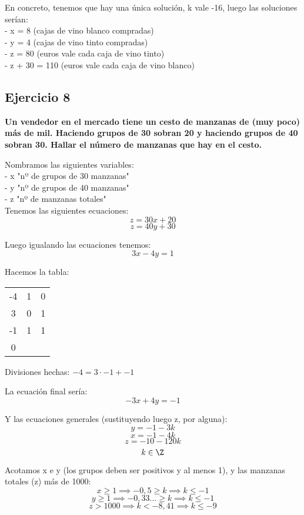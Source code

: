 \documentclass[11pt, a4paper, titlepage]{article}
\begin{document}
En concreto, tenemos que hay una única solución, k vale -16, luego las soluciones serían: \\
- x = 8 (cajas de vino blanco compradas) \\
- y = 4 (cajas de vino tinto compradas) \\
- z = 80 (euros vale cada caja de vino tinto) \\
- z + 30 = 110 (euros vale cada caja de vino blanco) \\

\subsection{\LARGE{Ejercicio 8}}

\textbf{Un vendedor en el mercado tiene un cesto de manzanas de (muy poco)
más de mil. Haciendo grupos de 30 sobran 20 y haciendo grupos de 40 sobran 30.
Hallar el número de manzanas que hay en el cesto.}

Nombramos las siguientes variables: \\
- x \equiv "nº de grupos de 30 manzanas" \\
- y \equiv "nº de grupos de 40 manzanas" \\
- z \equiv "nº de manzanas totales" \\

Tenemos las siguientes ecuaciones:
$$ z = 30x + 20 $$
$$ z = 40y + 30 $$

Luego igualando las ecuaciones tenemos:
$$ 3x - 4y = 1 $$

Hacemos la tabla:

\begin{center}
\begin{tabular}{c|cc}
-4 & 1 & 0 \\
3 & 0 & 1 \\
\hline
-1 & 1 & 1 \\
\hline
0
\end{tabular}
\end{center}

Divisiones hechas: $ -4 = 3 \cdot -1 + -1 $

La ecuación final sería:
$$ -3x + 4y = -1 $$

Y las ecuaciones generales (sustituyendo luego z, por alguna):
$$ y = -1 - 3k $$
$$ x = -1 - 4k $$
$$ z = -10 - 120k $$
$$ k \in \Z $$

Acotamos x e y (los grupos deben ser positivos y al menos 1), y las manzanas totales (z) más de 1000:
$$ x \geq 1 \implies -0,5 \geq k \implies k \leq -1 $$
$$ y \geq 1 \implies -0,33... \geq k \implies k \leq -1 $$
$$ z > 1000 \implies k < -8,41 \implies k \leq -9 $$
\end{document}
